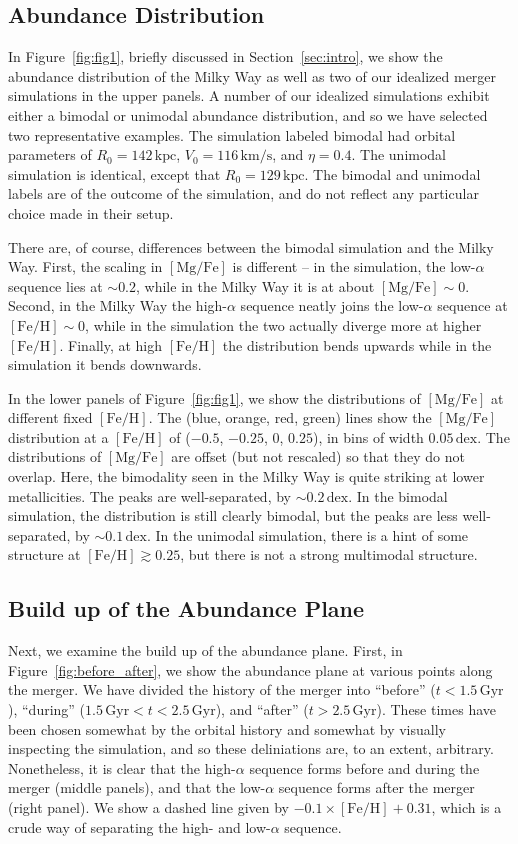 \documentclass[linenumbers, twocolumn]{aastex631}
\newcommand{\Gyr}{\ensuremath{\textrm{Gyr}}}
\newcommand{\kpc}{\ensuremath{\textrm{kpc}}}
\newcommand{\kms}{\ensuremath{\textrm{km}/\textrm{s}}}
\newcommand{\FeH}{\ensuremath{[\textrm{Fe}/\textrm{H}]}}
\newcommand{\MgFe}{\ensuremath{[\textrm{Mg}/\textrm{Fe}]}}
\newcommand{\dex}{\ensuremath{\textrm{dex}}}
\begin{document}
\subsection{Abundance Distribution}\label{ssec:abundplane}
In Figure~\ref{fig:fig1}, briefly discussed in Section~\ref{sec:intro}, we show the abundance distribution of the Milky Way as well as two of our idealized merger simulations in the upper panels. A number of our idealized simulations exhibit either a bimodal or unimodal abundance distribution, and so we have selected two representative examples. The simulation labeled bimodal had orbital parameters of $R_0=142\,\kpc$, $V_0=116\,\kms$, and $\eta=0.4$. The unimodal simulation is identical, except that $R_0=129\,\kpc$. The bimodal and unimodal labels are of the outcome of the simulation, and do not reflect any particular choice made in their setup.

There are, of course, differences between the bimodal simulation and the Milky Way. First, the scaling in \MgFe{} is different -- in the simulation, the low-$\alpha$ sequence lies at $\sim0.2$, while in the Milky Way it is at about $\MgFe\sim0$. Second, in the Milky Way the high-$\alpha$ sequence neatly joins the low-$\alpha$ sequence at $\FeH\sim0$, while in the simulation the two actually diverge more at higher \FeH{}. Finally, at high \FeH{} the distribution bends upwards while in the simulation it bends downwards.

In the lower panels of Figure~\ref{fig:fig1}, we show the distributions of \MgFe{} at different fixed \FeH{}. The (blue, orange, red, green) lines show the \MgFe{} distribution at a \FeH{} of ($-0.5$, $-0.25$, $0$, $0.25$), in bins of width $0.05\,\dex$. The distributions of \MgFe{} are offset (but not rescaled) so that they do not overlap. Here, the bimodality seen in the Milky Way is quite striking at lower metallicities. The peaks are well-separated, by $\sim0.2\,\dex$. In the bimodal simulation, the distribution is still clearly bimodal, but the peaks are less well-separated, by $\sim0.1\,\dex$. In the unimodal simulation, there is a hint of some structure at $\FeH \gtrsim 0.25$, but there is not a strong multimodal structure.

\subsection{Build up of the Abundance Plane}\label{ssec:abundplane_build}
Next, we examine the build up of the abundance plane. First, in Figure~\ref{fig:before_after}, we show the abundance plane at various points along the merger. We have divided the history of the merger into ``before'' ($t < 1.5\,\Gyr$), ``during'' ($1.5\,\Gyr < t < 2.5\,\Gyr$), and ``after'' ($t > 2.5\,\Gyr$). These times have been chosen somewhat by the orbital history and somewhat by visually inspecting the simulation, and so these deliniations are, to an extent, arbitrary. Nonetheless, it is clear that the high-$\alpha$ sequence forms before and during the merger (middle panels), and that the low-$\alpha$ sequence forms after the merger (right panel). We show a dashed line given by $-0.1\times\FeH + 0.31$, which is a crude way of separating the high- and low-$\alpha$ sequence.
\end{document}
